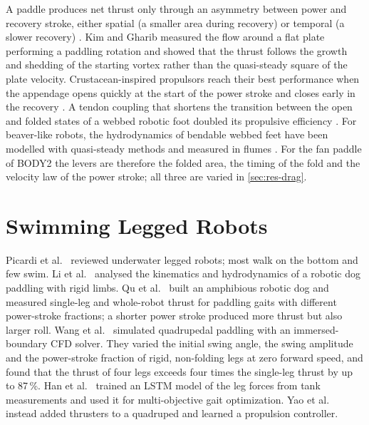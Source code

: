 A paddle produces net thrust only through an asymmetry between power and recovery stroke, either spatial
(a smaller area during recovery) or temporal (a slower recovery) \cite{HerreraAmaya2024}. Kim and Gharib
\cite{Kim2011} measured the flow around a flat plate performing a paddling rotation and showed that the thrust
follows the growth and shedding of the starting vortex rather than the quasi-steady square of the plate
velocity. Crustacean-inspired propulsors reach their best performance when the appendage opens quickly at
the start of the power stroke and closes early in the recovery \cite{Santos2026}. A tendon coupling that
shortens the transition between the open and folded states of a webbed robotic foot doubled its propulsive
efficiency \cite{Lin2024}. For beaver-like robots, the hydrodynamics of bendable webbed feet have been modelled
with quasi-steady methods and measured in flumes \cite{Chen2021,Chen2022}. For the fan paddle of BODY2 the levers are therefore
the folded area, the timing of the fold and the velocity law of the power stroke; all three are varied in \cref{sec:res-drag}.

\section{Swimming Legged Robots}
\label{sec:rw-robots}

Picardi et al.\ \cite{Picardi2023} reviewed underwater legged robots; most walk on the bottom and few swim.
Li et al.\ \cite{Li2019} analysed the kinematics and hydrodynamics of a robotic dog paddling with rigid
limbs. Qu et al.\ \cite{Qu2025} built an amphibious robotic dog and measured single-leg and whole-robot
thrust for paddling gaits with different power-stroke fractions; a shorter power stroke produced more thrust
but also larger roll. Wang et al.\ \cite{Wang2025} simulated quadrupedal paddling with an immersed-boundary
CFD solver. They varied the initial swing angle, the swing amplitude and the power-stroke fraction of rigid,
non-folding legs at zero forward speed, and found that the thrust of four legs exceeds four times the
single-leg thrust by up to 87\,\%. Han et al.\ \cite{Han2025} trained an LSTM model of the leg forces from
tank measurements and used it for multi-objective gait optimization. Yao et al.\ \cite{Yao2023} instead added
thrusters to a quadruped and learned a propulsion controller.

